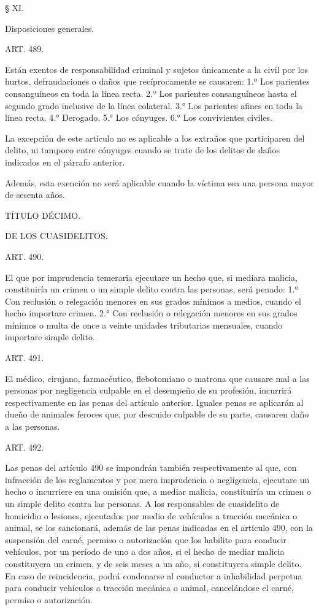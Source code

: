     § XI.

    Disposiciones generales.





    ART. 489.

    Están exentos de responsabilidad criminal y sujetos únicamente a la civil por los hurtos, defraudaciones o daños que recíprocamente se causaren:
    1.º Los parientes consanguíneos en toda la línea recta.
    2.º Los parientes consanguíneos hasta el segundo grado inclusive de la línea colateral.
    3.° Los parientes afines en toda la línea recta.
    4.° Derogado.
    5.° Los cónyuges.
    6.° Los convivientes civiles.

    La excepción de este artículo no es aplicable a los extraños que participaren del delito, ni tampoco entre cónyuges cuando se trate de los delitos de daños indicados en el párrafo anterior.

    Además, esta exención no será aplicable cuando la víctima sea una persona mayor de sesenta años.






    TÍTULO DÉCIMO.

    DE LOS CUASIDELITOS.




    ART. 490.

    El que por imprudencia temeraria ejecutare un hecho que, si mediara malicia, constituiría un crimen o un simple delito contra las personas, será penado:
    1.º Con reclusión o relegación menores en sus grados mínimos a medios, cuando el hecho importare crimen.
    2.° Con reclusión o relegación menores en sus grados mínimos o multa de once a veinte unidades tributarias mensuales, cuando importare simple delito.




    ART. 491.

    El médico, cirujano, farmacéutico, flebotomiano o matrona que causare mal a las personas por negligencia culpable en el desempeño de su profesión, incurrirá respectivamente en las penas del artículo anterior.
    Iguales penas se aplicarán al dueño de animales feroces que, por descuido culpable de su parte, causaren daño a las personas.



    ART. 492.

    Las penas del artículo 490 se impondrán también respectivamente al que, con infracción de los reglamentos y por mera imprudencia o negligencia, ejecutare un hecho o incurriere en una omisión que, a mediar malicia, constituiría un crimen o un simple delito contra las personas.
    A los responsables de cuasidelito de homicidio o lesiones, ejecutados por medio de vehículos a tracción mecánica o animal, se los sancionará, además de las penas indicadas en el artículo 490, con la suspensión del carné, permiso o autorización que los habilite para conducir vehículos, por un período de uno a dos años, si el hecho de mediar malicia constituyera un crimen, y de seis meses a un año, si constituyera simple delito. En caso de reincidencia, podrá condenarse al conductor a inhabilidad perpetua para conducir vehículos a tracción mecánica o animal, cancelándose el carné, permiso o autorización.


